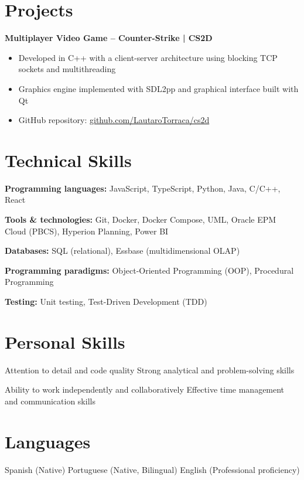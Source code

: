 \documentclass[10pt,a4paper]{article}
\begin{document}
\section*{Projects}

\textbf{Multiplayer Video Game -- Counter-Strike | CS2D}
\begin{itemize}[leftmargin=*, noitemsep, topsep=3pt, itemsep=2pt]
  \item Developed in C++ with a client-server architecture using blocking TCP
        sockets and multithreading
  \item Graphics engine implemented with SDL2pp and graphical interface built
        with Qt
  \item GitHub repository:
        \href{https://github.com/LautaroTorraca/cs2d}{github.com/LautaroTorraca/cs2d}
\end{itemize}

\section*{Technical Skills}

\textbf{Programming languages:} JavaScript, TypeScript, Python, Java, C/C++, React

\textbf{Tools \& technologies:} Git, Docker, Docker Compose, UML, Oracle EPM Cloud
(PBCS), Hyperion Planning, Power BI

\textbf{Databases:} SQL (relational), Essbase (multidimensional OLAP)

\textbf{Programming paradigms:} Object-Oriented Programming (OOP), Procedural
Programming

\textbf{Testing:} Unit testing, Test-Driven Development (TDD)

\section*{Personal Skills}

Attention to detail and code quality
\quad\textperiodcentered\quad Strong analytical and problem-solving skills

Ability to work independently and collaboratively
\quad\textperiodcentered\quad Effective time management and communication skills

\section*{Languages}

Spanish (Native)
\quad\textperiodcentered\quad Portuguese (Native, Bilingual)
\quad\textperiodcentered\quad English (Professional proficiency)
\end{document}
